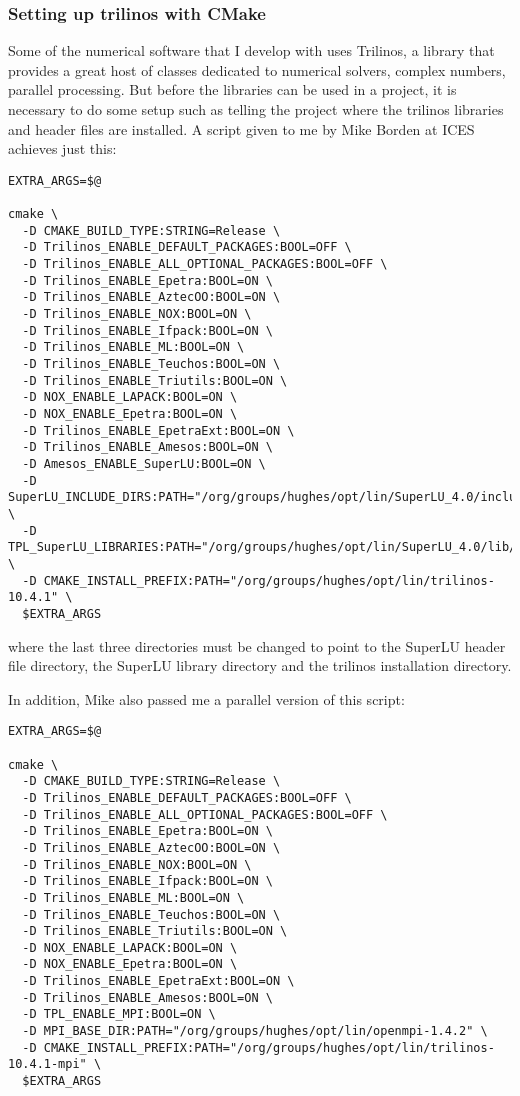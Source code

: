 \documentclass[a4paper, 10pt]{article}
\begin{document}
\subsubsection{Setting up trilinos with CMake}
\label{sec:setting-up-trilinos}

Some of the numerical software that I develop with uses Trilinos, a
library that provides a great host of classes dedicated to numerical
solvers, complex numbers, parallel processing. But before the
libraries can be used in a project, it is necessary to do some setup
such as telling the project where the trilinos libraries and header
files are installed. A script given to me by Mike Borden at ICES
achieves just this:

\begin{verbatim}
EXTRA_ARGS=$@

cmake \
  -D CMAKE_BUILD_TYPE:STRING=Release \
  -D Trilinos_ENABLE_DEFAULT_PACKAGES:BOOL=OFF \
  -D Trilinos_ENABLE_ALL_OPTIONAL_PACKAGES:BOOL=OFF \
  -D Trilinos_ENABLE_Epetra:BOOL=ON \
  -D Trilinos_ENABLE_AztecOO:BOOL=ON \
  -D Trilinos_ENABLE_NOX:BOOL=ON \
  -D Trilinos_ENABLE_Ifpack:BOOL=ON \
  -D Trilinos_ENABLE_ML:BOOL=ON \
  -D Trilinos_ENABLE_Teuchos:BOOL=ON \
  -D Trilinos_ENABLE_Triutils:BOOL=ON \
  -D NOX_ENABLE_LAPACK:BOOL=ON \
  -D NOX_ENABLE_Epetra:BOOL=ON \
  -D Trilinos_ENABLE_EpetraExt:BOOL=ON \
  -D Trilinos_ENABLE_Amesos:BOOL=ON \
  -D Amesos_ENABLE_SuperLU:BOOL=ON \
  -D SuperLU_INCLUDE_DIRS:PATH="/org/groups/hughes/opt/lin/SuperLU_4.0/include" \
  -D TPL_SuperLU_LIBRARIES:PATH="/org/groups/hughes/opt/lin/SuperLU_4.0/lib/libsuperlu_4.0.a" \
  -D CMAKE_INSTALL_PREFIX:PATH="/org/groups/hughes/opt/lin/trilinos-10.4.1" \
  $EXTRA_ARGS
\end{verbatim}

where the last three directories must be changed to point to the
SuperLU header file directory, the SuperLU library directory and the
trilinos installation directory.

In addition, Mike also passed me a parallel version of this script:
\begin{verbatim}
EXTRA_ARGS=$@

cmake \
  -D CMAKE_BUILD_TYPE:STRING=Release \
  -D Trilinos_ENABLE_DEFAULT_PACKAGES:BOOL=OFF \
  -D Trilinos_ENABLE_ALL_OPTIONAL_PACKAGES:BOOL=OFF \
  -D Trilinos_ENABLE_Epetra:BOOL=ON \
  -D Trilinos_ENABLE_AztecOO:BOOL=ON \
  -D Trilinos_ENABLE_NOX:BOOL=ON \
  -D Trilinos_ENABLE_Ifpack:BOOL=ON \
  -D Trilinos_ENABLE_ML:BOOL=ON \
  -D Trilinos_ENABLE_Teuchos:BOOL=ON \
  -D Trilinos_ENABLE_Triutils:BOOL=ON \
  -D NOX_ENABLE_LAPACK:BOOL=ON \
  -D NOX_ENABLE_Epetra:BOOL=ON \
  -D Trilinos_ENABLE_EpetraExt:BOOL=ON \
  -D Trilinos_ENABLE_Amesos:BOOL=ON \
  -D TPL_ENABLE_MPI:BOOL=ON \
  -D MPI_BASE_DIR:PATH="/org/groups/hughes/opt/lin/openmpi-1.4.2" \
  -D CMAKE_INSTALL_PREFIX:PATH="/org/groups/hughes/opt/lin/trilinos-10.4.1-mpi" \
  $EXTRA_ARGS
\end{verbatim}
\end{document}

